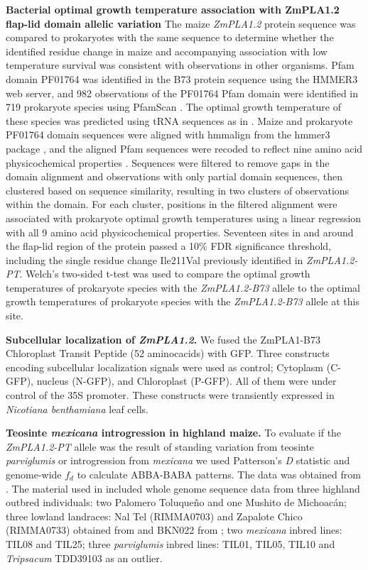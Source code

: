 \documentclass[9pt,twocolumn,twoside,lineno]{BioRxiv}
\begin{document}
\textbf{Bacterial optimal growth temperature association with ZmPLA1.2 flap-lid domain allelic variation}
The maize \textit{ZmPLA1.2} protein sequence was compared to prokaryotes with the same sequence to determine whether the identified residue change in maize and accompanying association with low temperature survival was consistent with observations in other organisms. 
Pfam domain PF01764 was identified in the B73 protein sequence using the HMMER3 web server, and 982 observations of the PF01764 Pfam domain were identified in 719 prokaryote species using PfamScan \cite{Potter2018-tk, El-Gebali2019-pw}. 
The optimal growth temperature of these species was predicted using tRNA sequences as in \cite{Cimen2020-dm}. 
Maize and prokaryote PF01764 domain sequences were aligned with hmmalign from the hmmer3 package \cite{Eddy2011-pd}, and the aligned Pfam sequences were recoded to reflect nine amino acid physicochemical properties \cite{Li2016-ut}. 
Sequences were filtered to remove gaps in the domain alignment and observations with only partial domain sequences, then clustered based on sequence similarity, resulting in two clusters of observations within the domain. 
For each cluster, positions in the filtered alignment were associated with prokaryote optimal growth temperatures using a linear regression with all 9 amino acid physicochemical properties. 
Seventeen sites in and around the flap-lid region of the protein passed a 10\% FDR significance threshold, including the single residue change Ile211Val previously identified in \textit{ZmPLA1.2-PT}. 
Welch’s two-sided t-test was used to compare the optimal growth temperatures of prokaryote species with the \textit{ZmPLA1.2-B73} allele to the optimal growth temperatures of prokaryote species with the \textit{ZmPLA1.2-B73} allele at this site.

\textbf{Subcellular localization of \textit{ZmPLA1.2}.}
We fused the ZmPLA1-B73 Chloroplast Transit Peptide (52 aminocacids) with GFP. %
Three constructs encoding subcellular localization signals were used as control; Cytoplasm (C-GFP), nucleus (N-GFP), and Chloroplast (P-GFP). 
All of them were under control of the 35S promoter. 
These constructs were transiently expressed in \textit{Nicotiana benthamiana} leaf cells.

\textbf{Teosinte \textit{mexicana} introgression in highland maize.}
To evaluate if the \textit{ZmPLA1.2-PT} allele was the result of standing variation from teosinte \textit{parviglumis} or introgression from \textit{mexicana} we used Patterson's \textit{D} statistic and genome-wide $f_{d}$ to calculate ABBA-BABA patterns. 
The data was obtained from \cite{Gonzalez-Segovia2019-jy}. 
The material used in \cite{Gonzalez-Segovia2019-jy} included whole genome sequence data from three highland outbred individuals: two Palomero Toluqueño and one Mushito de Michoacán; three lowland landraces: Nal Tel (RIMMA0703) and Zapalote Chico (RIMMA0733) obtained from \cite{Wang2017-bc} and  BKN022 from \cite{Bukowski2017-ng}; two \textit{mexicana} inbred lines: TIL08 and TIL25; three \textit{parviglumis} inbred lines: TIL01, TIL05, TIL10 and \textit{Tripsacum} TDD39103 \cite{Bukowski2017-ng} as an outlier. 
\end{document}
